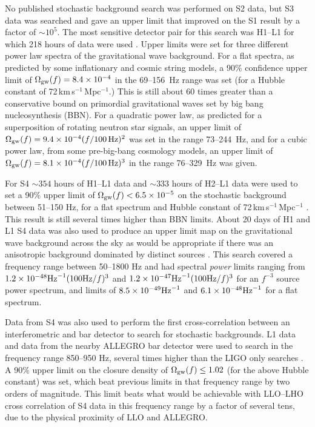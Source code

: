 \documentclass{article}
\begin{document}
No published stochastic background search was performed on S2 data, but S3 data
was searched and gave an upper limit that improved on the S1 result by a factor
of $\sim10^5$. The most sensitive detector pair for this search was H1--L1 for
which 218 hours of data were used \cite{Abbott:2005h}. Upper limits were set for
three different power law spectra of the gravitational wave background. For a
flat spectra, as predicted by some inflationary and cosmic string models, a 90\%
confidence upper limit of $\Omega_{\rm gw}(f) = 8.4\times10^{-4}$ in the
69--156~Hz range was set (for a Hubble constant of
72\,km\,s$^{-1}$\,Mpc$^{-1}$.) This is still about 60 times greater than a
conservative bound on primordial gravitational waves set by big bang
nucleosynthesis (BBN). For a quadratic power law, as predicted for a
superposition of rotating neutron star signals, an upper limit of $\Omega_{\rm
gw}(f) = 9.4\times10^{-4}(f/100\,{\rm Hz})^2$ was set in the range 73--244~Hz,
and for a cubic power law, from some pre-big-bang cosmology models, an upper
limit of $\Omega_{\rm gw}(f) = 8.1\times10^{-4}(f/100\,{\rm Hz})^3$ in the range
76--329~Hz was given.

For S4 $\sim354$ hours of H1--L1 data and $\sim333$ hours of H2--L1 data were
used to set a 90\% upper limit of $\Omega_{\rm gw}(f) < 6.5\times10^{-5}$ on
the stochastic background between 51--150 Hz, for a flat spectrum and Hubble
constant of 72\,km\,s$^{-1}$\,Mpc$^{-1}$ \cite{Abbott:2007e}. This result is
still several times higher than BBN limits. About 20 days of H1 and L1 S4 data
was also used to produce an upper limit map on the gravitational wave background
across the sky as would be appropriate if there was an anisotropic background
dominated by distinct sources \cite{Abbott:2007f}. This search covered a
frequency range between 50--1800 Hz and had spectral {\it power} limits ranging
from $1.2\times10^{-48} {\rm Hz}^{-1} (100 {\rm Hz}/f)^3$ and $1.2\times10^{-47}
{\rm Hz}^{-1} (100 {\rm Hz}/f)^3$ for an $f^{-3}$ source power spectrum, and
limits of $8.5\times10^{-49} {\rm Hz}^{-1}$ and $6.1\times10^{-48} {\rm
Hz}^{-1}$ for a flat spectrum.

Data from S4 was also used to perform the first cross-correlation between an
interferometric and bar detector to search for stochastic backgrounds. L1 data
and data from the nearby ALLEGRO bar detector were used to search in the
frequency range 850--950 Hz, several times higher than the LIGO only searches
\cite{Abbott:2007g}. A 90\% upper limit on the closure density of $\Omega_{\rm
gw}(f) \leq 1.02$ (for the above Hubble constant) was set, which beat previous
limits in that frequency range by two orders of magnitude. This limit beats what
would be achievable with LLO--LHO cross correlation of S4 data in this frequency
range by a factor of several tens, due to the physical proximity of LLO and
ALLEGRO.
\end{document}
